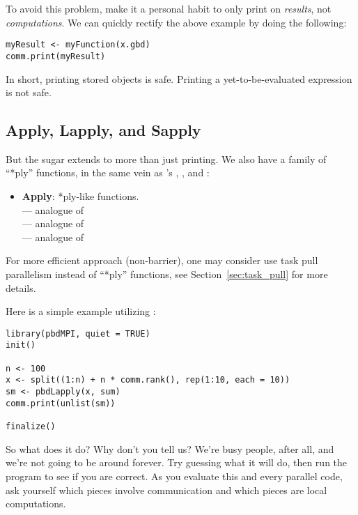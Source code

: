 To avoid this problem, make it a personal habit to only print on
\emph{results}, not \emph{computations}. We can quickly rectify the above
example by doing the following:
\begin{lstlisting}[language=rr,title=A Cautionary Tale of Printing in Parallel (3 of 3)]
myResult <- myFunction(x.gbd)
comm.print(myResult)
\end{lstlisting}

In short, printing stored objects is safe. Printing a yet-to-be-evaluated
expression is not safe.





\subsection{Apply, Lapply, and Sapply}\label{sec:pbdsugar2}

But the  sugar extends to more than just printing. We also have a
family of ``*ply'' functions, in the same vein as 's
, , and :
\begin{itemize}
  \item \textbf{Apply}: *ply-like functions.\\
   --- analogue of \\
   --- analogue of \\
   --- analogue of 
\end{itemize}
For more efficient approach (non-barrier), one may consider use task pull
parallelism instead of ``*ply'' functions, see Section~\ref{sec:task_pull}
for more details.

Here is a simple example utilizing :
\begin{lstlisting}[language=rr,title=Example 4]
library(pbdMPI, quiet = TRUE)
init()

n <- 100
x <- split((1:n) + n * comm.rank(), rep(1:10, each = 10))
sm <- pbdLapply(x, sum)
comm.print(unlist(sm))

finalize()
\end{lstlisting}

So what does it do? Why don't you tell us? We're busy people, after all,
and we're not going to be around forever. Try guessing what it will do,
then run the program to see if you are correct. As you evaluate this and
every parallel code, ask yourself which pieces involve communication and
which pieces are local computations.




